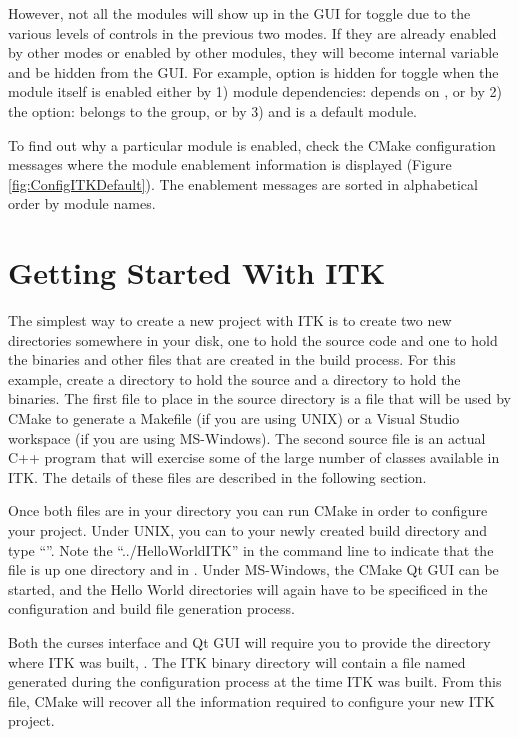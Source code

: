 However, not all the modules will show up in the GUI for toggle due to the
various levels of controls in the previous two modes.  If they are already
enabled by other modes or enabled by other modules, they will become internal
variable and be hidden from the GUI. For example,  
option is hidden for toggle when the module  itself is enabled either  by
1) module dependencies:  depends on ,   or by 2) the
 option:  belongs to the group,  or by 3)
 and  is a default module.

To find out why a particular module is enabled, check the CMake configuration
messages where the module enablement information is displayed (Figure
\ref{fig:ConfigITKDefault}). The enablement messages are sorted in alphabetical
order by module names.

\section{Getting Started With ITK}
\label{sec:GettingStartedWithITK}

The simplest way to create a new project with ITK is to create two new
directories somewhere in your disk, one to hold the source code and one to
hold the binaries and other files that are created in the build process. For
this example, create a  directory to hold the source and a
 directory to hold the binaries. The first file to
place in the source directory is a  file that will be
used by CMake to generate a Makefile (if you are using UNIX) or a Visual
Studio workspace (if you are using MS-Windows).  The second source file is an
actual C++ program that will exercise some of the large number of classes
available in ITK. The details of these files are described in the following
section.

Once both files are in your directory you can run CMake in order to configure
your project. Under UNIX, you can  to your newly created build
directory and type ``''. Note the
``../HelloWorldITK'' in the command line to indicate that the
 file is up one directory and in .
Under MS-Windows, the CMake Qt GUI can be started, and the Hello World
directories will again have to be specificed in the configuration and
build file generation process.

Both the curses interface and Qt GUI will require you to provide the directory
where ITK was built, .  The ITK binary directory will contain a
file named  generated during the configuration process
at the time ITK was built.  From this file, CMake will recover all the
information required to configure your new ITK project.

